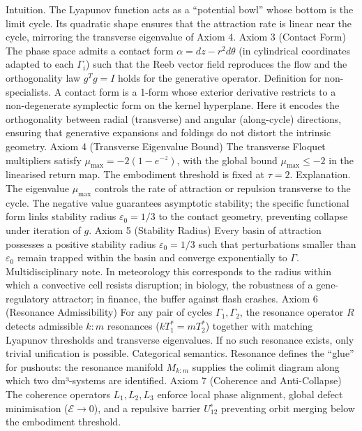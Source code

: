 Intuition. The Lyapunov function acts as a “potential bowl” whose bottom is the limit cycle. Its quadratic shape ensures that the attraction rate is linear near the cycle, mirroring the transverse eigenvalue of Axiom 4.
Axiom 3 (Contact Form)
The phase space admits a contact form $  \alpha = dz - r^2 d\theta  $ (in cylindrical coordinates adapted to each $  \Gamma_i  $) such that the Reeb vector field reproduces the flow and the orthogonality law $  g^T g = I  $ holds for the generative operator.
Definition for non-specialists. A contact form is a 1-form whose exterior derivative restricts to a non-degenerate symplectic form on the kernel hyperplane. Here it encodes the orthogonality between radial (transverse) and angular (along-cycle) directions, ensuring that generative expansions and foldings do not distort the intrinsic geometry.
Axiom 4 (Transverse Eigenvalue Bound)
The transverse Floquet multipliers satisfy $  \mu_{\max} = -2(1 - e^{-z})  $, with the global bound $  \mu_{\max} \le -2  $ in the linearised return map. The embodiment threshold is fixed at $  \tau = 2  $.
Explanation. The eigenvalue $  \mu_{\max}  $ controls the rate of attraction or repulsion transverse to the cycle. The negative value guarantees asymptotic stability; the specific functional form links stability radius $  \varepsilon_0 = 1/3  $ to the contact geometry, preventing collapse under iteration of $  g  $.
Axiom 5 (Stability Radius)
Every basin of attraction possesses a positive stability radius $  \varepsilon_0 = 1/3  $ such that perturbations smaller than $  \varepsilon_0  $ remain trapped within the basin and converge exponentially to $  \Gamma  $.
Multidisciplinary note. In meteorology this corresponds to the radius within which a convective cell resists disruption; in biology, the robustness of a gene-regulatory attractor; in finance, the buffer against flash crashes.
Axiom 6 (Resonance Admissibility)
For any pair of cycles $  \Gamma_1, \Gamma_2  $, the resonance operator $  R  $ detects admissible $  k:m  $ resonances ($  k T_1^* = m T_2^*  $) together with matching Lyapunov thresholds and transverse eigenvalues. If no such resonance exists, only trivial unification is possible.
Categorical semantics. Resonance defines the “glue” for pushouts: the resonance manifold $  M_{k:m}  $ supplies the colimit diagram along which two dm³-systems are identified.
Axiom 7 (Coherence and Anti-Collapse)
The coherence operators $  L_1, L_2, L_3  $ enforce local phase alignment, global defect minimisation ($  \mathcal{E} \to 0  $), and a repulsive barrier $  U_{12}^\epsilon  $ preventing orbit merging below the embodiment threshold.
